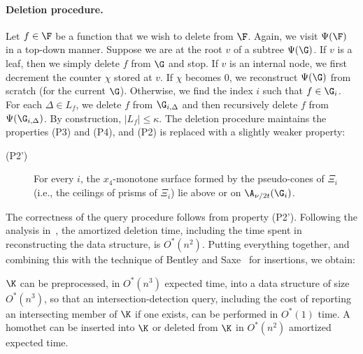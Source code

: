 \paragraph{Deletion procedure.}
\fi
Let $f\in\F$ be a function that we wish to delete from $\F$.
Again, we visit $\Psi(\F)$ in a top-down manner. Suppose we are at the root $v$ of a subtree $\Psi(\G)$. 
If $v$ is a leaf, then we simply delete $f$ from $\G$ and stop. If $v$ is an internal node, we first 
decrement the counter $\chi$ stored at $v$. If $\chi$ becomes $0$, we reconstruct $\Psi(\G)$ from
scratch (for the current $\G$). Otherwise, we find the index $i$ such that $f\in \G_i$. 
For each $\Delta\in L_f$,  we delete $f$ from $\G_{i,\Delta}$ and then recursively delete 
$f$ from $\Psi(\G_{i,\Delta})$. By construction, $|L_f|\le \kappa$. The deletion procedure 
maintains the properties (P3) and (P4), and (P2) is replaced with a slightly weaker property:
%
\smallskip
\begin{description}
	\item[(P2')] For every $i$, the $x_4$-monotone surface formed by the pseudo-cones of $\Xi_i$ 
        (i.e., the ceilings of prisms of $\Xi_i$) lie above or on $\A_{\nu/2t} (\G_i)$.
\end{description}
%
The correctness of the query procedure follows from property (P2'). Following the analysis 
in~\cite{AM95}, the amortized deletion time, including the time spent in reconstructing the data 
structure, is $O^*(n^2)$. 
Putting everything together, and combining this with the technique of Bentley and Saxe~\cite{BS80}
for insertions, we obtain:
%
\begin{lemma}
	\label{lem:log-qtime}
$\K$ can be preprocessed,
in $O^*(n^3)$ expected time, into a data structure of size $O^*(n^3)$, so that 
an intersection-detection query, including the cost of reporting an intersecting member of $\K$ 
if one exists, can be performed in $O^*(1)$ time. 
A homothet can be inserted into $\K$ or deleted from $\K$ in $O^*(n^2)$ amortized expected time.
\end{lemma}
%
